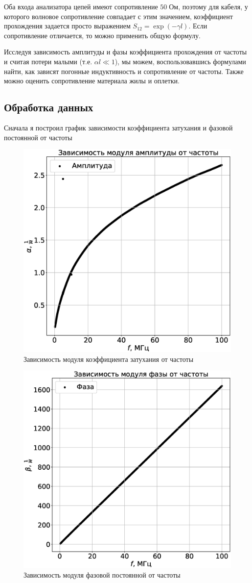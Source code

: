 \documentclass[a4paper,14pt]{extarticle}
\begin{document}
		Оба входа анализатора цепей имеют сопротивление $50 \; \text{Ом}$, поэтому для кабеля, у которого волновое сопротивление совпадает с этим значением, коэффициент прохождения задается просто выражением $S_{1 2} = \exp(-\gamma l)$. Если сопротивление отличается, то можно применить общую формулу.
		
		Исследуя зависимость амплитуды и фазы коэффициента прохождения от частоты и считая потери малыми (т.е. $\alpha l \ll 1$), мы можем, воспользовавшись формулами найти, как зависят погонные индуктивность и сопротивление от частоты. Также можно оценить сопротивление материала жилы и оплетки.
		\subsection{Обработка данных}
		Сначала я построил график зависимости коэффициента затухания и фазовой постоянной от частоты
		\begin{figure}[h!]
			\centering
			\includegraphics[width=.75\linewidth]{Lab3_2.eps}
			\caption{Зависимость модуля коэффициента затухания от частоты}
			\label{fig4}
		\end{figure}
		\newpage
		\begin{figure}[h!]
			\centering
			\includegraphics[width=.75\linewidth]{Lab3_3.eps}
			\caption{Зависимость модуля фазовой постоянной от частоты}
			\label{fig5}
		\end{figure}
\end{document}
